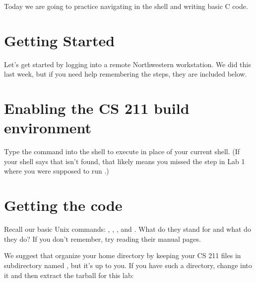 \documentclass{tufte-handout}
\begin{document}
\maketitle

Today we are going to practice navigating in the shell and writing basic
C code. 

\section{Getting Started}

Let's get started by logging into a remote Northwestern workstation. We
did this last week, but if you need help remembering the steps, they are
included below.

\section{Enabling the CS 211 build environment}

Type the command  into the shell to execute
 in place of your current shell. (If your shell says that
 isn’t found, that likely means you missed the step in
Lab 1 where you were supposed to run .)

\section{Getting the code}

Recall our basic Unix commands: , ,
, and . What do they stand for and what do
they do? If you don't remember, try reading their manual pages.

We suggest that organize your home directory by keeping your CS 211
files in subdirectory named , but it's up to you. If you have
such a directory, change into it and then extract the tarball for this
lab:
\end{document}
